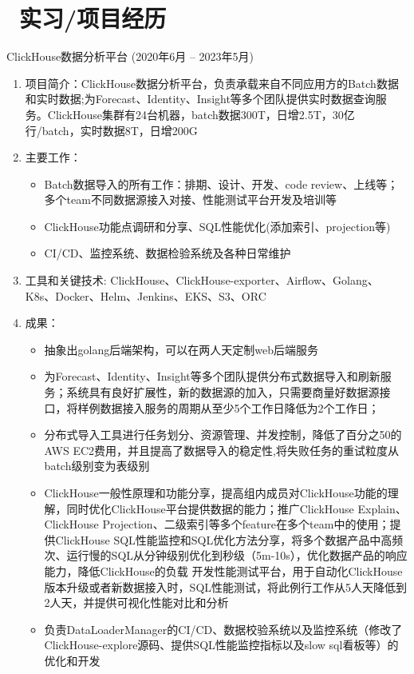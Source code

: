 \documentclass{resume}
\begin{document}
\section{\faUsers\ 实习/项目经历}
ClickHouse数据分析平台 (2020年6月 -- 2023年5月)
\begin{enumerate}
  \item 项目简介：ClickHouse数据分析平台，负责承载来自不同应用方的Batch数据和实时数据;为Forecast、Identity、Insight等多个团队提供实时数据查询服务。ClickHouse集群有24台机器，batch数据300T，日增2.5T，30亿行/batch，实时数据8T，日增200G
  \item 主要工作：
    \begin{itemize}
      \item Batch数据导入的所有工作：排期、设计、开发、code review、上线等；多个team不同数据源接入对接、性能测试平台开发及培训等
      \item ClickHouse功能点调研和分享、SQL性能优化(添加索引、projection等)
      \item CI/CD、监控系统、数据检验系统及各种日常维护
    \end{itemize}
  \item 工具和关键技术: ClickHouse、ClickHouse-exporter、Airflow、Golang、K8s、Docker、Helm、Jenkins、EKS、S3、ORC
  \item 成果：
    \begin{itemize}
      \item 抽象出golang后端架构，可以在两人天定制web后端服务
      \item 为Forecast、Identity、Insight等多个团队提供分布式数据导入和刷新服务；系统具有良好扩展性，新的数据源的加入，只需要商量好数据源接口，将样例数据接入服务的周期从至少5个工作日降低为2个工作日；
      \item 分布式导入工具进行任务划分、资源管理、并发控制，降低了百分之50的AWS EC2费用，并且提高了数据导入的稳定性,将失败任务的重试粒度从batch级别变为表级别
      \item ClickHouse一般性原理和功能分享，提高组内成员对ClickHouse功能的理解，同时优化ClickHouse平台提供数据的能力；推广ClickHouse Explain、ClickHouse Projection、二级索引等多个feature在多个team中的使用；提供ClickHouse SQL性能监控和SQL优化方法分享，将多个数据产品中高频次、运行慢的SQL从分钟级别优化到秒级（5m-10s），优化数据产品的响应能力，降低ClickHouse的负载
      开发性能测试平台，用于自动化ClickHouse版本升级或者新数据接入时，SQL性能测试，将此例行工作从5人天降低到2人天，并提供可视化性能对比和分析
      \item 负责DataLoaderManager的CI/CD、数据校验系统以及监控系统（修改了ClickHouse-explore源码、提供SQL性能监控指标以及slow sql看板等）的优化和开发
    \end{itemize}
\end{enumerate}
\end{document}
